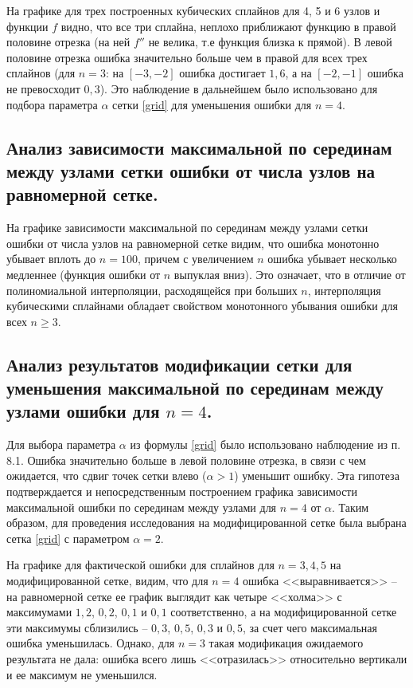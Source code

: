 \documentclass[a4paper, 12pt]{article}
\begin{document}
	На графике для трех построенных кубических сплайнов для 4, 5 и 6 узлов и функции $f$ видно, что все три сплайна, неплохо приближают функцию в правой половине отрезка (на ней $f''$ не велика, т.е функция близка к прямой). В левой половине отрезка ошибка значительно больше чем в правой для всех трех сплайнов (для $n=3$: на $[-3,-2]$ ошибка достигает $1,6$, а на $[-2,-1]$ ошибка не превосходит $0,3$). Это наблюдение в дальнейшем было использовано для подбора параметра $\alpha$ сетки \eqref{grid} для уменьшения ошибки для $n=4$.
	
	\subsection{Анализ зависимости максимальной по серединам между узлами сетки ошибки от числа узлов на равномерной сетке.}
	
	На графике зависимости максимальной по серединам между узлами сетки ошибки от числа узлов на равномерной сетке видим, что ошибка монотонно убывает вплоть до $n=100$, причем с увеличением $n$ ошибка убывает несколько медленнее (функция ошибки от $n$ выпуклая вниз). Это означает, что в отличие от полиномиальной интерполяции, расходящейся при больших $n$, интерполяция кубическими сплайнами обладает свойством монотонного убывания ошибки для всех $n\geq 3$.
	
	\subsection{Анализ результатов модификации сетки для уменьшения максимальной по серединам между узлами ошибки для $n=4$.}
	
	Для выбора параметра $\alpha$ из формулы \eqref{grid} было использовано наблюдение из п. 8.1. Ошибка значительно больше в левой половине отрезка, в связи с чем ожидается, что сдвиг точек сетки влево ($\alpha>1$) уменьшит ошибку. Эта гипотеза подтверждается и непосредственным построением графика зависимости максимальной ошибки по серединам между узлами для $n=4$ от $\alpha$. Таким образом, для проведения исследования на модифицированной сетке была выбрана сетка \eqref{grid} с параметром $\alpha=2$.
	
	На графике для фактической ошибки для сплайнов для $n=3,4,5$ на модифицированной сетке, видим, что для $n=4$ ошибка <<выравнивается>> -- на равномерной сетке ее график выглядит как четыре <<холма>> с максимумами $1,2$, $0,2$, $0,1$ и $0,1$ соответственно, а на модифицированной сетке эти максимумы сблизились -- $0,3$, $0,5$, $0,3$ и $0,5$, за счет чего максимальная ошибка уменьшилась. Однако, для $n=3$ такая модификация ожидаемого результата не дала: ошибка всего лишь <<отразилась>> относительно вертикали и ее максимум не уменьшился.
	
\end{document}
